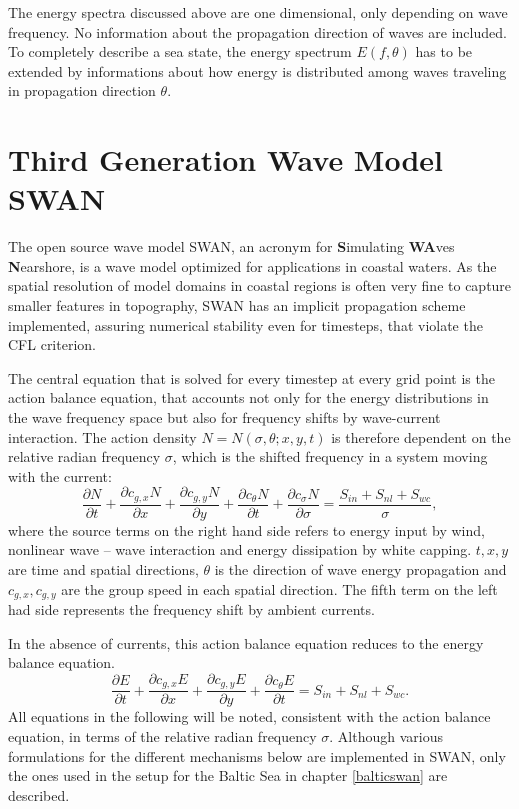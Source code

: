 The energy spectra discussed above are one dimensional, only depending on wave 
frequency. No information about the propagation direction of waves are 
included. To completely describe a sea state, the energy spectrum $E(f,\theta)$ 
has to be extended by informations about how energy is distributed among waves 
traveling in propagation direction $\theta$.

\section{Third Generation Wave Model SWAN}

The open source wave model SWAN, an acronym for \textbf{S}imulating 
\textbf{WA}ves \textbf{N}earshore, is a wave model optimized for applications in 
coastal waters. As the spatial resolution of model domains in coastal regions is 
often very fine to capture smaller features in topography, SWAN has an implicit 
propagation scheme implemented, assuring numerical stability even for timesteps, 
that violate the CFL criterion. 

The central equation that is solved for every timestep at every grid point is 
the action balance equation, that accounts not only for the energy 
distributions 
in the wave frequency space but also for frequency shifts by wave-current 
interaction. The action density $N=N(\sigma,\theta; x,y,t)$ is therefore 
dependent on the relative radian frequency $\sigma$, which is the shifted 
frequency in a system moving with the current:
\begin{equation}\label{ebe}
 \frac{\partial N}{\partial t} + \frac{\partial c_{g,x} N}{\partial x} + \frac{ 
\partial c_{g,y} N}{\partial y} + \frac{\partial c_{\theta} N}{\partial t} + 
\frac{\partial c_{\sigma} N}{\partial \sigma}= \frac{S_{in} + S_{nl} + 
S_{wc}}{\sigma},
\end{equation}
where the source terms on the right hand side refers to energy input by wind, 
nonlinear wave -- wave interaction and energy dissipation by white capping. $t, 
x ,y$ are time and spatial directions, $\theta$ is the direction of wave energy 
propagation and $c_{g,x}, c_{g,y}$ are the group speed in each spatial 
direction. The fifth term on the left had side represents the frequency shift 
by 
ambient currents.

In the absence of currents, this action balance equation reduces to the energy 
balance equation.
\begin{equation}\label{ebe}
 \frac{\partial E}{\partial t} + \frac{\partial c_{g,x} E}{\partial x} + \frac{ 
\partial c_{g,y} E}{\partial y} + \frac{\partial c_{\theta} E}{\partial t} = 
S_{in} + S_{nl} + S_{wc}.
\end{equation}
All equations in the following will be noted, consistent with the action balance 
equation, in terms of the relative radian frequency $\sigma$. Although various 
formulations for the different mechanisms below are implemented in SWAN, only 
the ones used in the setup for the Baltic Sea in chapter \ref{balticswan} are 
described.

